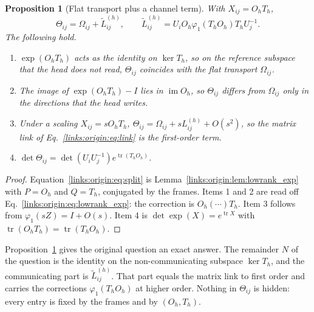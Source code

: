 \documentclass[11pt]{article}
\newtheorem{proposition}[theorem]{Proposition}
\theoremstyle{definition}
\theoremstyle{remark}
\providecommand{\tr}{\operatorname{tr}}
\providecommand{\im}{\operatorname{im}}
\begin{document}
\begin{proposition}[Flat transport plus a channel term]
\label{links:origin:prop:split}
With $X_{ij}=O_hT_h$,
\begin{equation}
\Theta_{ij}=\Omega_{ij}+\widetilde L_{ij}^{(h)},\qquad
\widetilde L_{ij}^{(h)}=U_iO_h\varphi_1(T_hO_h)T_hU_j^{-1}.
\label{links:origin:eq:split}
\end{equation}
The following hold.
\begin{enumerate}
\item $\exp(O_hT_h)$ acts as the identity on $\ker T_h$, so on the reference subspace that the head does not read, $\Theta_{ij}$ coincides with the flat transport $\Omega_{ij}$.
\item The image of $\exp(O_hT_h)-I$ lies in $\im O_h$, so $\Theta_{ij}$ differs from $\Omega_{ij}$ only in the directions that the head writes.
\item Under a scaling $X_{ij}=sO_hT_h$, $\Theta_{ij}=\Omega_{ij}+sL_{ij}^{(h)}+O(s^2)$, so the matrix link of Eq.~\eqref{links:origin:eq:link} is the first-order term.
\item $\det\Theta_{ij}=\det(U_iU_j^{-1})e^{\tr(T_hO_h)}$.
\end{enumerate}
\end{proposition}

\begin{proof}
Equation~\eqref{links:origin:eq:split} is Lemma~\ref{links:origin:lem:lowrank_exp} with $P=O_h$ and $Q=T_h$, conjugated by the frames. Items 1 and 2 are read off Eq.~\eqref{links:origin:eq:lowrank_exp}: the correction is $O_h(\cdots)T_h$. Item 3 follows from $\varphi_1(sZ)=I+O(s)$. Item 4 is $\det\exp(X)=e^{\tr X}$ with $\tr(O_hT_h)=\tr(T_hO_h)$.
\end{proof}

Proposition~\ref{links:origin:prop:split} gives the original question an exact answer. The remainder $N$ of the question is the identity on the non-communicating subspace $\ker T_h$, and the communicating part is $\widetilde L_{ij}^{(h)}$. That part equals the matrix link to first order and carries the corrections $\varphi_1(T_hO_h)$ at higher order. Nothing in $\Theta_{ij}$ is hidden: every entry is fixed by the frames and by $(O_h,T_h)$.
\end{document}

